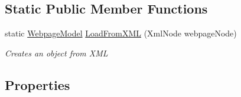 \subsection*{Static Public Member Functions}
\begin{DoxyCompactItemize}
\item 
static \hyperlink{class_web_analyzer_1_1_models_1_1_data_model_1_1_webpage_model}{Webpage\+Model} \hyperlink{class_web_analyzer_1_1_models_1_1_data_model_1_1_webpage_model_a26999baeddbe48b5c6f10a0b7510c807}{Load\+From\+X\+M\+L} (Xml\+Node webpage\+Node)
\begin{DoxyCompactList}\small\item\em Creates an object from X\+M\+L \end{DoxyCompactList}\end{DoxyCompactItemize}
\subsection*{Properties}
